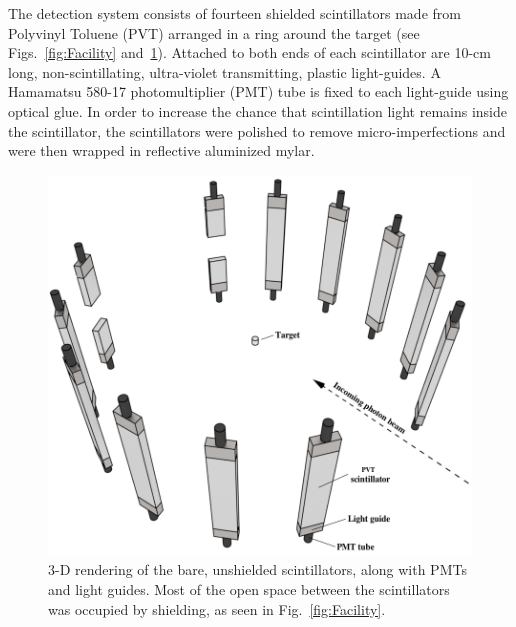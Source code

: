 The detection system consists of fourteen shielded scintillators made from Polyvinyl Toluene (PVT) arranged in a ring around the target (see Figs.~\ref{fig:Facility} and~\ref{fig:DetGeom}).
Attached to both ends of each scintillator are 10-cm long, non-scintillating, ultra-violet transmitting, plastic light-guides.
A Hamamatsu 580-17 photomultiplier (PMT) tube is fixed to each light-guide using optical glue.
In order to increase the chance that scintillation light remains inside the scintillator, the scintillators were polished to remove micro-imperfections and were then wrapped in reflective aluminized mylar.
\begin{figure}[]
    \centering
    \includegraphics[width = \figsize\textwidth]{Detectors.png}
    \caption{3-D rendering of the bare, unshielded scintillators, along with PMTs and light guides.
    Most of the open space between the scintillators was occupied by shielding, as seen in Fig.~\ref{fig:Facility}.
    }
    \label{fig:DetGeom}
\end{figure}

